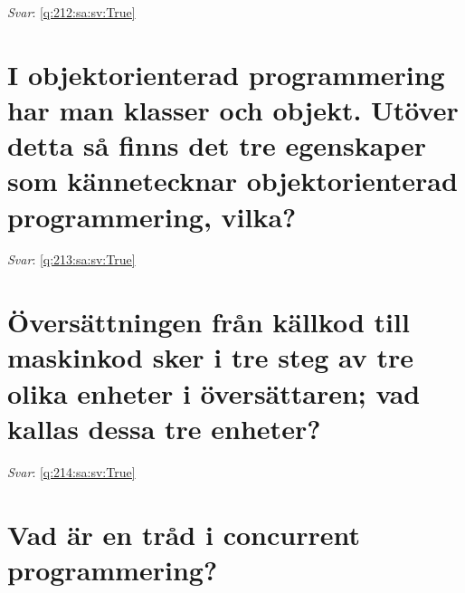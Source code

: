 \documentclass[a4paper,11pt,oneside]{book}
\begin{document}
\begin{sloppypar}
\label{q:212:sa:sv:False}

\vspace{2cm}

\noindent\makebox[\textwidth]{\hrulefill}

\vspace{1cm}

\textit{Svar}: \autoref{q:212:sa:sv:True}



\section{I objektorienterad programmering har man klasser och objekt. Ut\"over detta s\r{a} finns det tre egenskaper som k\"annetecknar objektorienterad programmering, vilka?}

\label{q:213:sa:sv:False}

\vspace{2cm}

\noindent\makebox[\textwidth]{\hrulefill}

\vspace{1cm}

\textit{Svar}: \autoref{q:213:sa:sv:True}



\section{\"Overs\"attningen fr\r{a}n k\"allkod till maskinkod sker i tre steg av tre olika enheter i \"overs\"attaren; vad kallas dessa tre enheter?}

\label{q:214:sa:sv:False}

\vspace{2cm}

\noindent\makebox[\textwidth]{\hrulefill}

\vspace{1cm}

\textit{Svar}: \autoref{q:214:sa:sv:True}



\section{Vad \"ar en tr\r{a}d i concurrent programmering?}

\label{q:215:sa:sv:False}

\vspace{2cm}

\noindent\makebox[\textwidth]{\hrulefill}


\end{sloppypar}
\end{document}
